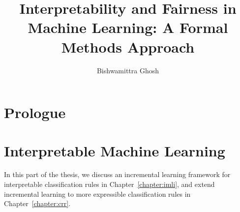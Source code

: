 \newcommand{\propformula}{\phi}
\newcommand{\propclause}{C}
\newcommand{\literal}{V}
\newcommand{\varquantifier}{Q}
\newcommand{\varweight}{W}
\newcommand{\ssatformula}{\Phi}

\newcommand{\graphvertices}{\mathbf{V}}
\newcommand{\graphvertex}{V}
\newcommand{\graphedges}{\mathbf{E}}
\newcommand{\graphedge}{E}
\newcommand{\bncomplexity}{C}
\newcommand{\bnnumdiscrete}{\mathsf{Card}}

\newcommand{\dataset}{\mathbf{D}}
\newcommand{\datadistribution}{\mathcal{D}}

\newcommand{\imli}{\ensuremath{\mathsf{IMLI}}}



\title{Interpretability and Fairness in Machine Learning: A Formal Methods Approach}
\author{Bishwamittra Ghosh}


\maketitle

\declaredate{\today}
\declarationpage

\begin{frontmatter}
  
  \tableofcontents
  
  
  \listofalgorithms
  \listoffigures
  \listoftables
\end{frontmatter}


	\part{Prologue}
	
	
	
	
	\part{Interpretable Machine Learning}
	In this part of the thesis, we discuss  an incremental learning framework for interpretable classification rules in Chapter~\ref{chapter:imli}, and extend incremental learning to more expressible classification rules in Chapter~\ref{chapter:crr}. 
	
